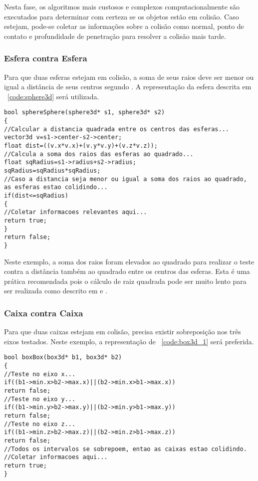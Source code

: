 Nesta fase, os algoritmos mais custosos e complexos computacionalmente são
executados para determinar com certeza se os objetos estão em colisão.
Caso estejam, pode-se coletar as informações sobre a colisão como normal, ponto
de contato e profundidade de penetração para resolver a colisão mais tarde.

\subsubsection{Esfera contra Esfera}

Para que duas esferas estejam em colisão, a soma de seus raios deve ser menor
ou igual a distância de seus centros segundo .
A representação da esfera descrita em ~\ref{code:sphere3d} será utilizada.

\begin{lstlisting}[frame=single,caption=Colisão entre esferas\label{code:collisionSphereSphere}]
bool sphereSphere(sphere3d* s1, sphere3d* s2)
{
//Calcular a distancia quadrada entre os centros das esferas...
vector3d v=s1->center-s2->center;
float dist=((v.x*v.x)+(v.y*v.y)+(v.z*v.z));
//Calcula a soma dos raios das esferas ao quadrado...
float sqRadius=s1->radius+s2->radius;
sqRadius=sqRadius*sqRadius;
//Caso a distancia seja menor ou igual a soma dos raios ao quadrado, as esferas estao colidindo...
if(dist<=sqRadius)
{
//Coletar informacoes relevantes aqui...
return true;
}
return false;
}
\end{lstlisting}

Neste exemplo, a soma dos raios foram elevados ao quadrado para realizar o
teste contra a distância também ao quadrado entre os centros das esferas.
Esta é uma prática recomendada pois o cálculo de raiz quadrada pode ser muito
lento para ser realizada como descrito em  e .

\subsubsection{Caixa contra Caixa}

Para que duas caixas estejam em colisão, precisa existir sobreposição nos três
eixos testados.
Neste exemplo, a representação de ~\ref{code:box3d_1} será preferida.

\begin{lstlisting}[frame=single,caption=Colisão entre caixas\label{code:collisionBoxBox}]
bool boxBox(box3d* b1, box3d* b2)
{
//Teste no eixo x...
if((b1->min.x>b2->max.x)||(b2->min.x>b1->max.x))
return false;
//Teste no eixo y...
if((b1->min.y>b2->max.y)||(b2->min.y>b1->max.y))
return false;
//Teste no eixo z...
if((b1->min.z>b2->max.z)||(b2->min.z>b1->max.z))
return false;
//Todos os intervalos se sobrepoem, entao as caixas estao colidindo.
//Coletar informacoes aqui...
return true;
}
\end{lstlisting}

